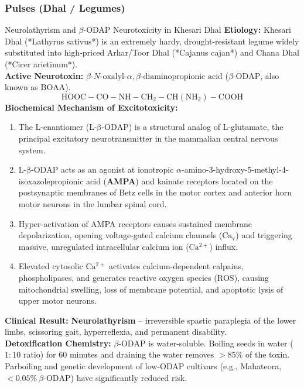 \documentclass[11pt,a4paper,oneside]{article}
\begin{document}
\subsubsection{Pulses (Dhal / Legumes)}

\begin{mechanismbox}{Neurolathyrism and $\beta$-ODAP Neurotoxicity in Khesari Dhal}
\textbf{Etiology:} Khesari Dhal (*Lathyrus sativus*) is an extremely hardy, drought-resistant legume widely substituted into high-priced Arhar/Toor Dhal (*Cajanus cajan*) and Chana Dhal (*Cicer arietinum*).\\
\textbf{Active Neurotoxin:} $\beta\text{-}N\text{-oxalyl-}\alpha,\beta\text{-diaminopropionic acid}$ ($\beta\text{-ODAP}$, also known as $\mathrm{BOAA}$).
$$\mathrm{HOOC-CO-NH-CH_2-CH(NH_2)-COOH}$$
\textbf{Biochemical Mechanism of Excitotoxicity:}
\begin{enumerate}
    \item The L-enantiomer ($\mathrm{L\text{-}\beta\text{-}ODAP}$) is a structural analog of L-glutamate, the principal excitatory neurotransmitter in the mammalian central nervous system.
    \item $\mathrm{L\text{-}\beta\text{-}ODAP}$ acts as an agonist at ionotropic $\alpha$-amino-3-hydroxy-5-methyl-4-isoxazolepropionic acid (\textbf{AMPA}) and kainate receptors located on the postsynaptic membranes of Betz cells in the motor cortex and anterior horn motor neurons in the lumbar spinal cord.
    \item Hyper-activation of AMPA receptors causes sustained membrane depolarization, opening voltage-gated calcium channels ($\mathrm{Ca_v}$) and triggering massive, unregulated intracellular calcium ion ($\mathrm{Ca^{2+}}$) influx.
    \item Elevated cytosolic $\mathrm{Ca^{2+}}$ activates calcium-dependent calpains, phospholipases, and generates reactive oxygen species ($\mathrm{ROS}$), causing mitochondrial swelling, loss of membrane potential, and apoptotic lysis of upper motor neurons.
\end{enumerate}
\textbf{Clinical Result:} \textbf{Neurolathyrism} -- irreversible spastic paraplegia of the lower limbs, scissoring gait, hyperreflexia, and permanent disability.\\
\textbf{Detoxification Chemistry:} $\beta\text{-ODAP}$ is water-soluble. Boiling seeds in water ($1:10$ ratio) for 60 minutes and draining the water removes $>85\%$ of the toxin. Parboiling and genetic development of low-ODAP cultivars (e.g., Mahateora, $<0.05\%\ \beta\text{-ODAP}$) have significantly reduced risk.
\end{mechanismbox}
\end{document}
